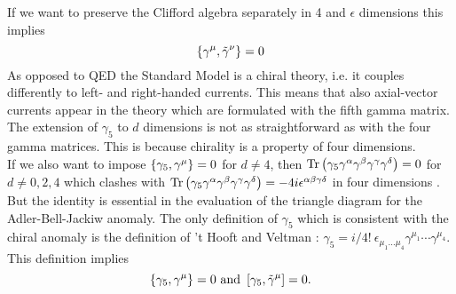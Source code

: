 If we want to preserve the Clifford algebra separately in 4 and $\epsilon$ dimensions this implies
\begin{equation}
\left\lbrace \gamma^{\mu},\tilde{\gamma}^{\nu} \right\rbrace = 0
\end{equation}
As opposed to QED the Standard Model is a chiral theory, i.e. it couples differently to left- and right-handed currents. This means that also axial-vector currents appear in the theory which are formulated with the fifth gamma matrix. The extension of $\gamma_5$ to $d$ dimensions is not as straightforward as with the four gamma matrices. This is because chirality is a property of four dimensions.\\
If we also want to impose $\left\lbrace \gamma_5,\gamma^{\mu} \right\rbrace = 0$ for $d \neq 4$, then $\mathrm{Tr}\left( \gamma_5 \gamma^{\alpha}\gamma^{\beta}\gamma^{\gamma}\gamma^{\delta} \right) = 0$  for $d \neq 0,2,4$ which clashes with $\mathrm{Tr}\left( \gamma_5 \gamma^{\alpha}\gamma^{\beta}\gamma^{\gamma}\gamma^{\delta} \right) = -4i \epsilon^{\alpha\beta\gamma\delta}$ in four dimensions \cite{Gamma5}. But the identity is essential in the evaluation of the triangle diagram for the Adler-Bell-Jackiw anomaly. The only definition of $\gamma_5$ which is consistent with the chiral anomaly is the definition of 't Hooft and Veltman \cite{HVgamma5}: $\gamma_5 = i/4! \ \epsilon_{\mu_1 \dots \mu_4} \gamma^{\mu_1} \cdots \gamma^{\mu_4}$. This definition implies
\begin{equation}
\left\lbrace \gamma_5, \gamma^{\mu} \right\rbrace = 0  \text{ and }  \left[ \gamma_5, \tilde{\gamma}^{\mu} \right] = 0.
\end{equation} 



